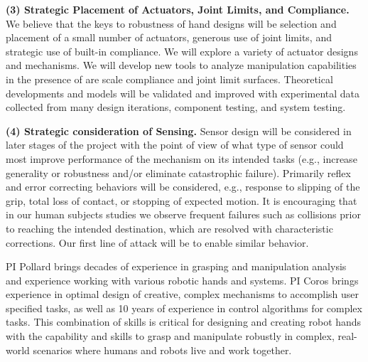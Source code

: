 \smallskip\noindent
{\bf (3) Strategic Placement of Actuators, Joint Limits, and Compliance.}  We believe that the keys to robustness of hand designs will be selection and placement of a small number of actuators, generous use of joint limits, and strategic use of built-in compliance.    We will explore a variety of actuator designs and mechanisms.   We will develop new tools to analyze manipulation capabilities in the presence of are scale compliance and joint limit surfaces.    Theoretical developments and models will be validated and improved with experimental data collected from many design iterations, component testing, and system testing. 

\smallskip\noindent
{\bf (4) Strategic consideration of Sensing.}    Sensor design will be considered in later stages of the project with the point of view of what type of sensor could most improve performance of the mechanism on its intended tasks (e.g., increase generality or robustness and/or eliminate catastrophic failure).  Primarily reflex and error correcting behaviors will be considered, e.g., response to slipping of the grip, total loss of contact, or stopping of expected motion.   It is encouraging that in our human subjects studies we observe frequent failures such as collisions prior to reaching the intended destination, which are resolved with characteristic corrections.   Our first line of attack will be to enable similar behavior.
	
PI Pollard brings decades of experience in grasping and manipulation analysis and experience working with various robotic hands and systems.   PI Coros brings experience in optimal design of creative, complex mechanisms to accomplish user specified tasks, as well as 10 years of experience in control algorithms for complex tasks.     This combination of skills is critical for designing and creating robot hands with the capability and skills to grasp and manipulate robustly in complex, real-world scenarios where humans and robots live and work together.

